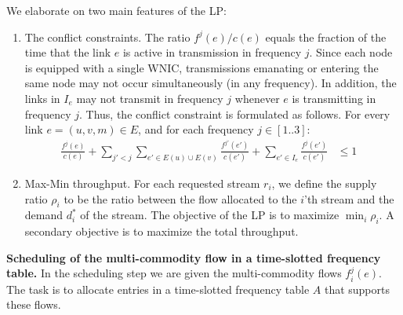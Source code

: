 \documentclass[11pt]{article}
\newenvironment{proof sketch}[1]{\noindent {\emph{Proof sketch of #1:}}}{\hfill \qed}
\begin{document}
\medskip
\noindent
We elaborate on two main features of the LP:
\begin{enumerate}
\item The conflict constraints.  The ratio $f^j(e)/c(e)$ equals the
  fraction of the time that the link $e$ is active in transmission in
  frequency $j$. Since each node is equipped with a single WNIC,
  transmissions emanating or entering the same node may not occur
  simultaneously (in any frequency). In addition, the links in $I_e$
  may not transmit in frequency $j$ whenever $e$ is transmitting in
  frequency $j$. Thus, the conflict constraint is formulated as
  follows. For every link $e=(u,v,m)\in E$, and for each frequency
  $j\in[1..3]$:
  \begin{align*}
    \frac{f^j(e)}{c(e)} + \sum_{j'< j} \sum_{e'\in E(u)\cup E(v)}
    \frac{f^{j'}(e')}{c(e')} + \sum_{e' \in I_{e}}
    \frac{f^j(e')}{c(e')} & \leq 1 &
  \end{align*}
\item Max-Min throughput.  For each requested stream $r_i$, we define
  the supply ratio $\rho_i$ to be the ratio between the flow allocated
  to the $i$'th stream and the demand $d^*_i$ of the stream.  The
  objective of the LP is to maximize $\min_i \rho_i$.  A secondary
  objective is to maximize the total throughput.
\end{enumerate}

\medskip
\noindent
\textbf{Scheduling of the multi-commodity flow in a time-slotted
  frequency table.}  In the scheduling step we are given the
multi-commodity flows $f^j_i(e)$.  The task is to allocate entries in
a time-slotted frequency table $A$ that supports these flows.
\end{document}
